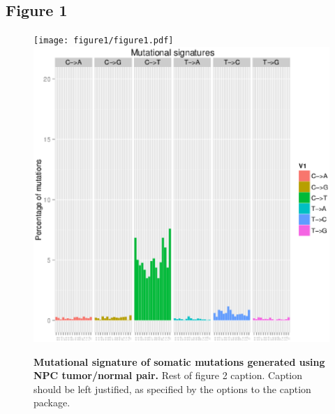 \documentclass[10pt]{article}
\begin{document}
\subsection*{Figure 1}
\begin{figure}[!ht]
\begin{center}
\ifpdf
% 
\texttt{[image: figure1/figure1.pdf]}
\else
\includegraphics[width=6in]{figure1/mutation_signature.15.30.48_November_05_2013.eps}
\fi
\end{center}
\caption{
{\bf Mutational signature of somatic mutations generated using NPC tumor/normal pair.}  Rest of figure 2  caption.  Caption 
should be left justified, as specified by the options to the caption 
package.
}
\label{Figure_label2}
\end{figure}
\end{document}
